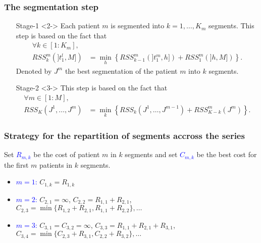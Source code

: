 \documentclass[compress]{beamer}
\begin{document}
\begin{frame}
\frametitle{The segmentation step}

\begin{itemize}
\item[Stage-1]<2-> Each patient $m$ is segmented into $k=1,\ldots,K_m$
segments. This step is based on the fact that
\begin{eqnarray*}
\forall k \in [1:K_m], & \\
RSS_{k}^m(]t_{1}^l,M]) & = \min_{h}
\left\{RSS_{k-1}^m(]t_{1}^m,h])+RSS_{1}^m(]h,M]) \right\}.
\end{eqnarray*}
Denoted by $J^m$ the best segmentation of the patient $m$ into $k$
segments. \\

\item[Stage-2]<3-> This step is based on the fact that
\begin{eqnarray*}
\forall m \in [1:M], &\\
RSS_{K}(J^1,\hdots,J^m) &= \min_{k}
\left\{RSS_{k}(J^1,\hdots,J^{m-1})+RSS_{K-k}^m(J^m) \right\}.
\end{eqnarray*}
\end{itemize}
\end{frame}


\begin{frame}
\frametitle{Strategy for the repartition of segments accross the series}
Set \textcolor{blue}{$R_{m,k}$} be the cost of patient $m$ in $k$ segments and set \textcolor{blue}{$C_{m,k}$} be the best cost for the first $m$ patients in $k$ segments.
\begin{itemize}
\item <2->\textcolor{blue}{ $m=1$:} $C_{1,k}=R_{1,k}$
\item <3-> \textcolor{blue}{$m=2$:} $C_{2,1}=\infty$, $C_{2,2}=R_{1,1}+R_{2,1}$, $C_{2,3}=\min\{R_{1,2}+R_{2,1},R_{1,1}+R_{2,2}\},\ldots$
\item <4-> \textcolor{blue}{$m=3$:} $C_{3,1}=C_{3,2}=\infty$, $C_{3,3}=R_{1,1}+R_{2,1}+R_{3,1}$, $C_{3,4}=\min\{C_{2,3}+R_{3,1},C_{2,2}+R_{3,2}\},\ldots$   
\end{itemize}

\end{frame}
\end{document}
